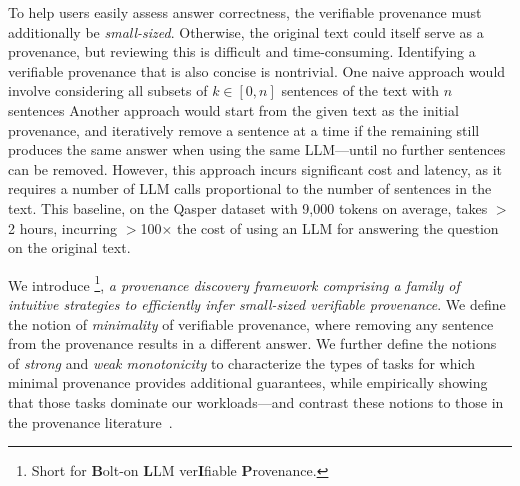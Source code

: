 To help users easily assess answer correctness, 
the verifiable provenance must additionally be {\em small-sized}. 
Otherwise, the original text could itself serve as a provenance, but reviewing this is difficult and time-consuming.  
Identifying a verifiable  provenance that is also concise is nontrivial. 
One naive approach would involve considering all subsets of $k \in [0, n]$ sentences 
of the text with $n$ sentences 
Another approach would 
start from the given text as the initial provenance, and 
iteratively remove a sentence at a time  
if the remaining still produces the same answer 
when using the same LLM---until no further sentences can be removed.
However, this approach incurs significant cost and latency, 
as it requires a number of LLM calls 
proportional to the number of sentences in the text. 
This baseline, on the Qasper dataset  with 9,000 tokens on average, 
takes $>$2 hours, incurring  $>$100$\times$ the 
cost of using an LLM for answering the question on the original text.



We introduce \sys\footnote{Short for {\bf B}olt-on {\bf L}LM ver{\bf I}fiable {\bf P}rovenance.},
{\em a provenance discovery framework comprising 
a family of intuitive strategies to efficiently infer small-sized verifiable provenance}. 
We define the notion of {\em minimality} of verifiable provenance, 
where removing any sentence from the provenance 
results in a different answer.  
We further define
the notions of {\em strong} and {\em weak monotonicity} to
characterize the types of tasks for which
minimal provenance
provides additional guarantees, while
empirically showing that those tasks
dominate our workloads---and contrast
these notions  to those in the provenance
literature~\cite{cheney2009provenance,buneman2001and,green2007provenance,glavic2021data}.

